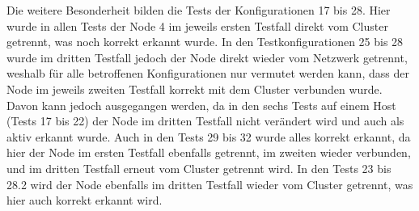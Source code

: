 Die weitere Besonderheit bilden die Tests der Konfigurationen 17 bis 28.
Hier wurde in allen Tests der Node 4 im jeweils ersten Testfall direkt vom Cluster getrennt, was noch korrekt erkannt wurde.
In den Testkonfigurationen 25 bis 28 wurde im dritten Testfall jedoch der Node direkt wieder vom Netzwerk getrennt, weshalb für alle betroffenen Konfigurationen nur vermutet werden kann, dass der Node im jeweils zweiten Testfall korrekt mit dem Cluster verbunden wurde.
Davon kann jedoch ausgegangen werden, da in den sechs Tests auf einem Host (Tests 17 bis 22) der Node im dritten Testfall nicht verändert wird und auch als aktiv erkannt wurde.
Auch in den Tests 29 bis 32 wurde alles korrekt erkannt, da hier der Node im ersten Testfall ebenfalls getrennt, im zweiten wieder verbunden, und im dritten Testfall erneut vom Cluster getrennt wird.
In den Tests 23 bis 28.2 wird der Node ebenfalls im dritten Testfall wieder vom Cluster getrennt, was hier auch korrekt erkannt wird.
